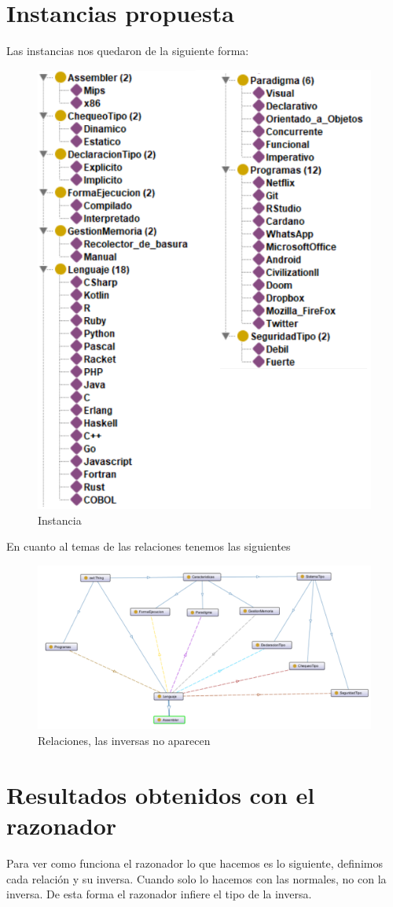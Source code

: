 \documentclass[12pt, titlepage, a4paper]{article}
\begin{document}
\section{Instancias propuesta}
Las instancias nos quedaron de la siguiente forma:
\begin{figure}[H]
    \centering
    \includegraphics[width=.5\textwidth]{Imagenes/Instancias.png}
    \caption{Instancia}
\end{figure}

En cuanto al temas de las relaciones tenemos las siguientes
\begin{figure}[H]
    \centering
    \includegraphics[width=.8\textwidth]{Imagenes/Relaciones.png}
    \caption{Relaciones, las inversas no aparecen}
\end{figure}

\section{Resultados obtenidos con el razonador}
Para ver como funciona el razonador lo que hacemos es lo siguiente, 
definimos cada relación y su inversa. Cuando  solo 
lo hacemos con las normales, no con la inversa. De esta forma el 
razonador infiere el tipo de la inversa.\\
\end{document}

